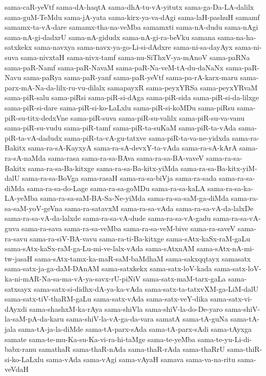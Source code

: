 {sama-caR-yeVtf
sama-dA-haqtA
sama-dhA-tu-vA-yitutx
sama-ga-Da-LA-dalilx
sama-guM-TeMdu
sama-jA-yata
sama-kirx-ya-va-dAgi
sama-laH-pashuH
samamf
samamx-ta-vA-dare
samamx-tha-na-veMba
samamxti
sama-nA-dudu
sama-nAgi
sama-nA-gi-dadxrU
sama-nA-gidudx
sama-nA-gi-ra-beVku
samana
sama-na-ha-satxkekx
sama-navxya
sama-navx-ya-go-Li-si-dAdxre
sama-ni-sa-dayAyx
sama-ni-suva
sama-nivxtaH
sama-nivx-tamf
sama-nu-SiThxV-ya-mAnoV
sama-paRNa
sama-paR-Namf
sama-paR-NavaM
sama-paR-Na-veM-tA-du-daNaNx
sama-paR-Navu
sama-paRya
sama-paR-yanf
sama-paR-yeVtf
sama-pa-rA-karx-maru
sama-parx-mA-Na-da-lilx-ru-vu-dilalx
samapayxR
sama-peyxYRSa
sama-peyxYRvaM
sama-piR-salu
sama-piRsi
sama-piR-si-dAga
sama-piR-sida
sama-piR-si-da-lilxge
sama-piR-si-dare
sama-piR-si-ko-LaLxlu
sama-piR-si-koMDu
sama-piRsu
sama-piR-su-titx-dedxVne
sama-piR-suva
sama-piR-su-valilx
sama-piR-su-va-vanu
sama-piR-su-vudu
sama-piR-tamf
sama-piR-ta-suKaM
sama-piR-ta-vAda
sama-piR-ta-vA-dadudx
sama-piR-ta-vA-gu-tatxve
sama-piR-ta-va-ne-yidxda
sama-ra-Bakitx
sama-ra-sA-KayxyA
sama-ra-sA-devxY-ta-vAda
sama-ra-sA-kArA
sama-ra-sA-naMda
sama-rasa
sama-ra-sa-BAva
sama-ra-sa-BA-vaveV
sama-ra-sa-Bakitx
sama-ra-sa-Ba-kitxge
sama-ra-sa-Ba-kitx-yiMda
sama-ra-sa-Ba-kitx-yiM-dalU
sama-ra-sa-BoVga
sama-rasaH
sama-ra-sa-biVja
sama-ra-sada
sama-ra-sa-diMda
sama-ra-sa-do-Lage
sama-ra-sa-goMDu
sama-ra-sa-kaLA
sama-ra-sa-ka-LA-yeMba
sama-ra-sa-saM-BA-Sa-Ne-yiMda
sama-ra-sa-saM-ga-diMda
sama-ra-sa-saM-yoV-geVna
sama-ra-satavxM
sama-ra-sa-vAda
sama-ra-sa-vA-da-lalxDe
sama-ra-sa-vA-da-lalxde
sama-ra-sa-vA-dude
sama-ra-sa-vA-gadu
sama-ra-sa-vA-guva
sama-ra-sava
sama-ra-sa-veMba
sama-ra-sa-veM-bive
sama-ra-saveV
sama-ra-savu
sama-ra-siV-BA-vavu
sama-ra-ti-Ba-kitxge
sama-sAtx-kaSx-raM-gaLu
sama-sAtx-kaSx-raM-ga-Lu-mi-ve-lalx-vAda
sama-sAtxnAM
sama-sAtx-nA-mi-tw-jasaH
sama-sAtx-tamx-ka-maR-saM-baMdhaM
sama-sakxqqtayx
samasatx
sama-satx-ja-ga-daM-DAnAM
sama-satxkekx
sama-satx-loV-kada
sama-satx-loV-ka-ni-mAR-Na-sa-ma-vA-ya-savx-rU-piNiV
sama-satx-maM-tarx-gaLa
sama-satxsayx
sama-satx-si-didhx-dA-ya-ka-vAda
sama-satx-ta-tatxvXM-ga-LiM-dalU
sama-satx-tiV-thaRM-gaLu
sama-satx-vAda
sama-satx-veY-dika
sama-satx-vi-dAyxdi
sama-shashxM-ka-rAya
sama-shiVla
sama-shiV-la-do-De-yaro
sama-shiV-la-saM-pA-da-karu
sama-shiV-la-vA-ga-da-vara
samatA
sama-tA-guNa
sama-tA-jala
sama-tA-ja-la-diMde
sama-tA-parx-sAda
sama-tA-parx-sAdi
sama-tAyxga
samate
sama-te-mu-Ka-su-Ka-vi-ra-hi-taMge
sama-te-yeMba
sama-te-yu-Li-di-babx-ranu
samathaR
sama-thaR-nAda
sama-thaR-rAda
sama-thaRrU
sama-thiR-si-ko-LaLxlu
sama-vAda
sama-vAgi
sama-vAyaH
samava
sama-va-na-ritu
sama-veVdaH
}
